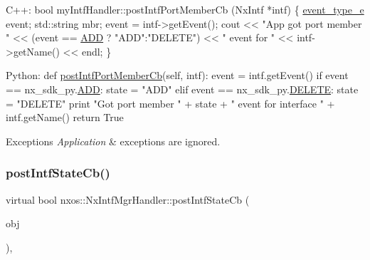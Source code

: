 \begin{DoxyCode}
C++:
   \textcolor{keywordtype}{bool} myIntfHandler::postIntfPortMemberCb (NxIntf *intf)
   \{
      \mbox{\hyperlink{nx__common_8h_af9a9040b7681199d386e94eb888018cb}{event\_type\_e}}  event;
      std::string mbr;
      \textcolor{keyword}{event} = intf->getEvent();
      cout << \textcolor{stringliteral}{"App got port member "} << (\textcolor{keyword}{event} == \mbox{\hyperlink{nx__common_8h_af9a9040b7681199d386e94eb888018cba93d8c810253e44a0fd5f3d8d26032ad5}{ADD}} ? 
     \textcolor{stringliteral}{"ADD"}:\textcolor{stringliteral}{"DELETE"}) << \textcolor{stringliteral}{" event for "} << intf->getName() << endl;
   \}

Python:   
   def \mbox{\hyperlink{classnxos_1_1_nx_intf_mgr_handler_ae3a76ba4fb97b941d9f11e9210d89a94}{postIntfPortMemberCb}}(\textcolor{keyword}{self}, intf):
      event = intf.getEvent()
      if event == nx\_sdk\_py.\mbox{\hyperlink{nx__common_8h_af9a9040b7681199d386e94eb888018cba93d8c810253e44a0fd5f3d8d26032ad5}{ADD}}:
         state = \textcolor{stringliteral}{"ADD"}
      elif event == nx\_sdk\_py.\mbox{\hyperlink{nx__common_8h_af9a9040b7681199d386e94eb888018cba7ec7c9f77651a43ea2562bb5bcb6a3a9}{DELETE}}:
         state = \textcolor{stringliteral}{"DELETE"}
      print \textcolor{stringliteral}{"Got port member "} + state + 
          \textcolor{stringliteral}{" event for interface "} + intf.getName()
      return True
\end{DoxyCode}



\begin{DoxyExceptions}{Exceptions}
{\em Application} & exceptions are ignored. \\
\hline
\end{DoxyExceptions}
\mbox{\label{classnxos_1_1_nx_intf_mgr_handler_a9c3d4d357b1f0ab07558b4611c693755}} 
\subsubsection{\texorpdfstring{post\+Intf\+State\+Cb()}{postIntfStateCb()}}
{\footnotesize\ttfamily virtual bool nxos\+::\+Nx\+Intf\+Mgr\+Handler\+::post\+Intf\+State\+Cb (\begin{DoxyParamCaption}\item[{\mbox{\hyperlink{classnxos_1_1_nx_intf}{Nx\+Intf}} $\ast$}]{obj }\end{DoxyParamCaption})\hspace{0.3cm}{\ttfamily [inline]}, {\ttfamily [virtual]}}

